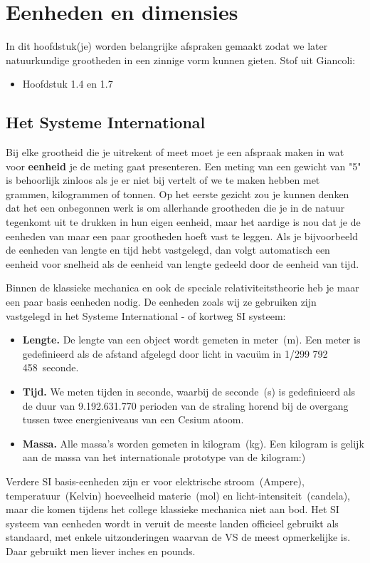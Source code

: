 \chapter{Eenheden en dimensies}

In dit hoofdstuk(je) worden belangrijke afspraken gemaakt zodat we later
natuurkundige grootheden in een zinnige vorm kunnen gieten. 
Stof uit Giancoli:
\begin{itemize}
\item Hoofdstuk 1.4 en 1.7
\end{itemize}

\section{Het Systeme International}

Bij elke grootheid die je uitrekent of meet moet je een afspraak maken in wat
voor {\bf eenheid} je de meting gaat presenteren. Een meting van een gewicht
van "5" is behoorlijk zinloos als je er niet bij vertelt of we te maken hebben met
grammen, kilogrammen of tonnen. Op het eerste gezicht zou je kunnen denken
dat het een onbegonnen werk is om allerhande grootheden die je in de natuur
tegenkomt uit te drukken in hun eigen eenheid, maar het aardige is nou
dat je de eenheden van maar een paar grootheden hoeft  vast te leggen. Als
je bijvoorbeeld de eenheden van lengte en tijd hebt vastgelegd, dan volgt
automatisch een eenheid voor snelheid als de eenheid van lengte gedeeld
door de eenheid van tijd.

Binnen de klassieke mechanica en ook de speciale relativiteitstheorie heb je 
maar een paar basis eenheden nodig. De eenheden zoals wij ze gebruiken 
zijn vastgelegd in het Systeme International - of kortweg SI systeem:
\begin{itemize}
\item {\bf Lengte.} De lengte van een object wordt gemeten in meter~(m). Een meter
is gedefinieerd als de afstand afgelegd door licht in vacu\"{u}m in 1/299 792 458~seconde.
\item {\bf Tijd.} We meten tijden in seconde, waarbij de seconde~(s) is gedefinieerd
als de duur van 9.192.631.770 perioden van de straling horend bij de overgang tussen
twee energieniveaus van een Cesium atoom.
\item {\bf Massa.} Alle massa's worden gemeten in kilogram~(kg). Een kilogram is 
gelijk aan de massa van het internationale prototype van de kilogram:)
\end{itemize}
Verdere SI basis-eenheden zijn er voor elektrische stroom~(Ampere), temperatuur~(Kelvin)
hoeveelheid materie~(mol) en licht-intensiteit~(candela), maar die komen tijdens
het college klassieke mechanica niet aan bod. Het SI systeem van eenheden wordt
in veruit de meeste landen officieel gebruikt als standaard, met enkele uitzonderingen
waarvan de VS de meest opmerkelijke is. Daar gebruikt men liever inches en pounds.

